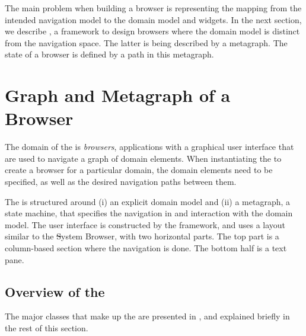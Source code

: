 \documentclass[a4paper,10pt,twoside]{book}
\begin{document}
The main problem when building a browser is representing the mapping from the intended navigation model to the domain model and widgets. 
In the next section, we describe \ob, a framework to design browsers where the domain model is distinct from the navigation space. The latter is being described by a metagraph. The state of a browser is defined by a path in this metagraph.

\section{Graph and Metagraph of a Browser} \label{sec:omnibrowser}

The domain of the \obf is \emph{browsers}, applications with a graphical user interface that are used to navigate a graph of domain elements. When instantiating  the \obf to create a browser for a particular domain, the domain elements need to be specified, as well as the desired navigation paths between them.

The \obf is structured around (i) an explicit domain model and (ii) a metagraph, a state machine, that specifies the navigation in and interaction with the domain model. The user interface is constructed by the framework, and uses a layout similar to the \st System Browser, with two horizontal parts. The top part is a column-based section where the navigation is done. The bottom half is a text pane.


\subsection{Overview of the \obf}\label{sec:overview}
The major classes that make up the \obf are presented in , and explained briefly in the rest of this section. %
\end{document}
